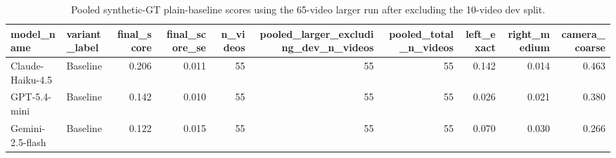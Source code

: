 \begin{table}
\caption{Pooled synthetic-GT plain-baseline scores using the 65-video larger run after excluding the 10-video dev split.}
\label{tab:cvs-act-synthetic-pooled-larger65-excluding-dev}
\begin{tabular}{llrrrrrrrr}
\toprule
model_name & variant_label & final_score & final_score_se & n_videos & pooled_larger_excluding_dev_n_videos & pooled_total_n_videos & left_exact & right_medium & camera_coarse \\
\midrule
Claude-Haiku-4.5 & Baseline & 0.206 & 0.011 & 55 & 55 & 55 & 0.142 & 0.014 & 0.463 \\
GPT-5.4-mini & Baseline & 0.142 & 0.010 & 55 & 55 & 55 & 0.026 & 0.021 & 0.380 \\
Gemini-2.5-flash & Baseline & 0.122 & 0.015 & 55 & 55 & 55 & 0.070 & 0.030 & 0.266 \\
\bottomrule
\end{tabular}
\end{table}
